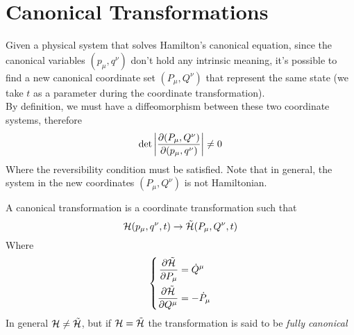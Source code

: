 \documentclass[../admech.tex]{subfiles}
\begin{document}
\section{Canonical Transformations}
Given a physical system that solves Hamilton's canonical equation, since the canonical variables $(p_\mu,q^\nu)$ don't hold any intrinsic meaning, it's possible to find a new canonical coordinate set $(P_\mu,Q^\nu)$ that represent the same state (we take $t$ as a parameter during the coordinate transformation).\\
By definition, we must have a diffeomorphism between these two coordinate systems, therefore
\begin{equation}
	\det\abs{\pdv{(P_\mu,Q^\nu)}{(p_\mu,q^\nu)}}\ne0
	\label{eq:detjac}
\end{equation}
Where the reversibility condition must be satisfied. Note that in general, the system in the new coordinates $(P_\mu,Q^\nu)$ is not Hamiltonian.\\
\begin{dfn}
	A canonical transformation is a coordinate transformation such that
	\begin{equation}
		\mathcal{H}(p_\mu,q^\nu,t)\to\tilde{\mathcal{H}}(P_\mu,Q^\nu,t)
		\label{eq:cantr}
	\end{equation}
	Where
	\begin{equation}
		\left\{ \begin{aligned}
				\pdv{\tilde{\mathcal{H}}}{P_\mu}&=\dot{Q}^\mu\\
				\pdv{\tilde{\mathcal{H}}}{Q^\mu}&=-\dot{P}_\mu
		\end{aligned}\right.
		\label{eq:caneom}
	\end{equation}
	In general $\mathcal{H}\ne\tilde{\mathcal{H}}$, but if $\mathcal{H}=\tilde{\mathcal{H}}$ the transformation is said to be \emph{fully canonical}
\end{dfn}
\end{document}
